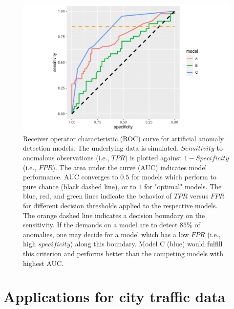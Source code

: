 \documentclass[conference]{IEEEtran}
\begin{document}
\begin{figure}[t]
\centering
\includegraphics[width=0.95\linewidth, trim=65 0 65 0, clip]{images/ROC.pdf}%
\caption{Receiver operator characteristic (ROC) \cite{bewick2004statistics} curve for artificial anomaly detection models. The underlying data is simulated. $Sensitivity$ to anomalous observations (i.e., $TPR$) is plotted against $1-Specificity$ (i.e., $FPR$). The area under the curve (AUC) indicates model performance. AUC converges to $0.5$ for models which perform to pure chance (black dashed line), or to $1$ for "optimal" models. The blue, red, and green lines indicate the behavior of $TPR$ versus $FPR$ for different decision thresholds applied to the respective models. The orange dashed line indicates a decision boundary on the sensitivity. If the demands on a model are to detect $85\%$ of anomalies, one may decide for a model which has a low $FPR$ (i.e., high $specificity$) along this boundary. Model C (blue) would fulfill this criterion and performs better than the competing models with highest AUC.}
\label{fig:roc}
\end{figure}






\section{Applications for city traffic data}
\end{document}
